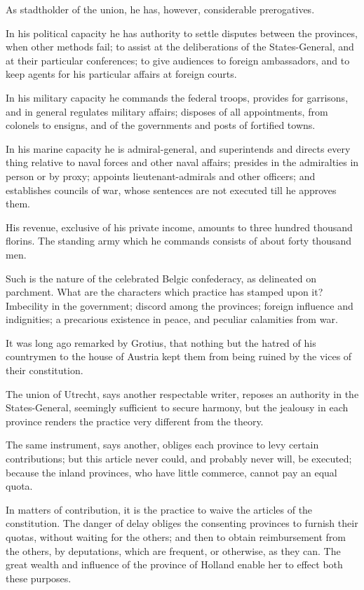 As stadtholder of the union, he has, however, considerable prerogatives.

In his political capacity he has authority to settle disputes between the provinces, when other methods fail; to assist at the deliberations of the States-General, and at their particular conferences; to give audiences to foreign ambassadors, and to keep agents for his particular affairs at foreign courts.

In his military capacity he commands the federal troops, provides for garrisons, and in general regulates military affairs; disposes of all appointments, from colonels to ensigns, and of the governments and posts of fortified towns.

In his marine capacity he is admiral-general, and superintends and directs every thing relative to naval forces and other naval affairs; presides in the admiralties in person or by proxy; appoints lieutenant-admirals and other officers; and establishes councils of war, whose sentences are not executed till he approves them.

His revenue, exclusive of his private income, amounts to three hundred thousand florins. The standing army which he commands consists of about forty thousand men.

Such is the nature of the celebrated Belgic confederacy, as delineated on parchment. What are the characters which practice has stamped upon it? Imbecility in the government; discord among the provinces; foreign influence and indignities; a precarious existence in peace, and peculiar calamities from war.

It was long ago remarked by Grotius, that nothing but the hatred of his countrymen to the house of Austria kept them from being ruined by the vices of their constitution.

The union of Utrecht, says another respectable writer, reposes an authority in the States-General, seemingly sufficient to secure harmony, but the jealousy in each province renders the practice very different from the theory.

The same instrument, says another, obliges each province to levy certain contributions; but this article never could, and probably never will, be executed; because the inland provinces, who have little commerce, cannot pay an equal quota.

In matters of contribution, it is the practice to waive the articles of the constitution. The danger of delay obliges the consenting provinces to furnish their quotas, without waiting for the others; and then to obtain reimbursement from the others, by deputations, which are frequent, or otherwise, as they can. The great wealth and influence of the province of Holland enable her to effect both these purposes.

